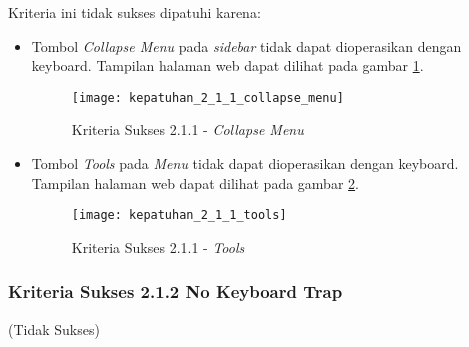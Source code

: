 Kriteria ini tidak sukses dipatuhi karena:
\begin{itemize}
	\item Tombol \textit{Collapse Menu} pada \textit{sidebar} tidak dapat dioperasikan dengan keyboard. Tampilan halaman web dapat dilihat pada gambar \ref{fig:kepatuhan_2_1_1_collapse_menu}.
	\begin{figure}[H]
		\centering  
		\texttt{[image: kepatuhan\_2\_1\_1\_collapse\_menu]}  
		\caption[Kriteria Sukses 2.1.1 - \textit{Collapse Menu}]{Kriteria Sukses 2.1.1 - \textit{Collapse Menu}} 
		\label{fig:kepatuhan_2_1_1_collapse_menu} 
	\end{figure}

	\item Tombol \textit{Tools} pada \textit{Menu} tidak dapat dioperasikan dengan keyboard. Tampilan halaman web dapat dilihat pada gambar \ref{fig:kepatuhan_2_1_1_tools}.
	\begin{figure}[H]
		\centering  
		\texttt{[image: kepatuhan\_2\_1\_1\_tools]}  
		\caption[Kriteria Sukses 2.1.1 - \textit{Tools}]{Kriteria Sukses 2.1.1 - \textit{Tools}} 
		\label{fig:kepatuhan_2_1_1_tools} 
	\end{figure}

\end{itemize}

\subsubsection{Kriteria Sukses 2.1.2 No Keyboard Trap}
\label{subsubsec:kepatuhan_kriteria_2.1.2}
(Tidak Sukses) \\

